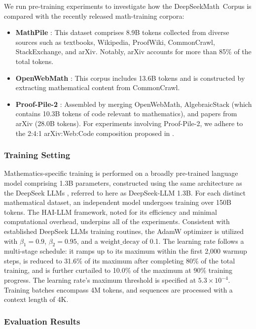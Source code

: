 \begin{itemize}[topsep=0pt]
We run pre-training experiments to investigate how the DeepSeekMath~Corpus is compared with the recently released math-training corpora:

\begin{itemize}[topsep=0pt]
    \item \textbf{MathPile} \citep{mathpile}: This dataset comprises 8.9B tokens collected from diverse sources such as textbooks, Wikipedia, ProofWiki, CommonCrawl, StackExchange, and arXiv. Notably, arXiv accounts for more than 85\% of the total tokens.
    \item \textbf{OpenWebMath} \citep{openwebmath}: This corpus includes 13.6B tokens and is constructed by extracting mathematical content from CommonCrawl.
    \item \textbf{Proof-Pile-2} \citep{llemma}: Assembled by merging OpenWebMath, AlgebraicStack (which contains 10.3B tokens of code relevant to mathematics), and papers from arXiv (28.0B tokens). For experiments involving Proof-Pile-2, we adhere to the 2:4:1 arXiv:Web:Code composition proposed in \cite{llemma}.
\end{itemize}

\subsubsection{Training Setting}
\label{sec:quality-policy}
Mathematics-specific training is performed on a broadly pre-trained language model comprising 1.3B parameters, constructed using the same architecture as the DeepSeek LLMs \citep{deepseek-llm}, referred to here as DeepSeek-LLM 1.3B. For each distinct mathematical dataset, an independent model undergoes training over 150B tokens. The HAI-LLM \citep{haillm} framework, noted for its efficiency and minimal computational overhead, underpins all of the experiments. Consistent with established DeepSeek LLMs training routines, the AdamW optimizer \citep{adamW} is utilized with $\beta_1=0.9$, $\beta_2=0.95$, and a $\mathrm{weight\_decay}$ of 0.1. The learning rate follows a multi-stage schedule: it ramps up to its maximum within the first 2,000 warmup steps, is reduced to 31.6\% of its maximum after completing 80\% of the total training, and is further curtailed to 10.0\% of the maximum at 90\% training progress. The learning rate’s maximum threshold is specified at $5.3 \times 10^{-4}$. Training batches encompass 4M tokens, and sequences are processed with a context length of 4K.

\subsubsection{Evaluation Results}


\end{itemize}
